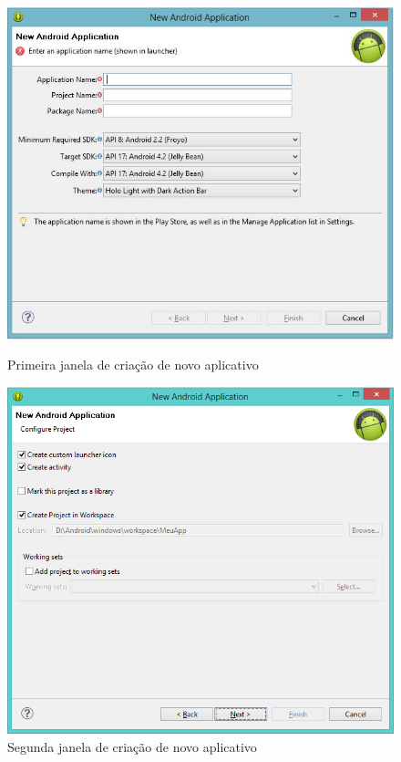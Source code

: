\documentclass[a4paper,12pt,brazil,doubleside]{book}
\begin{document}
\begin{figure}[H]
  \centering
  \includegraphics[width=.8\textwidth]{figuras/1-criando-app.jpg}
  \caption{Primeira janela de criação de novo aplicativo}
  \label{fig:d}
  \includegraphics[width=.8\textwidth]{figuras/2-criando-app-2.png}
  \caption{Segunda janela de criação de novo aplicativo}
  \label{fig:c}
\end{figure}
\newpage
\end{document}
